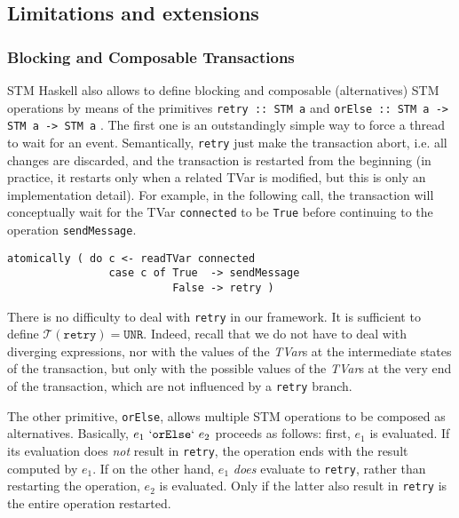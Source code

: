 \documentclass[submission,copyright,creativecommons]{eptcs}
\newcommand{\pt}{\ensuremath{\mathcal{T}}}
\begin{document}
\subsection{Limitations and extensions}
\label{discussion}

\subsubsection*{Blocking and Composable Transactions} 
STM Haskell also allows to define blocking and composable (alternatives) STM operations by means of the primitives \texttt{retry :: STM a} and \texttt{orElse :: STM a -> STM a -> STM a} \cite{composable-memory-transactions}.
The first one is an outstandingly simple way to force a thread to wait for an event. Semantically, \texttt{retry} just make the transaction abort, i.e. all changes are discarded, and the transaction is restarted from the beginning (in practice, it restarts only when a related TVar is modified, but this is only an implementation detail). For example, in the following call, the transaction will conceptually wait for the TVar \texttt{connected} to be \texttt{True} before continuing to the operation \texttt{sendMessage}.

\begin{footnotesize}
\begin{verbatim}
atomically ( do c <- readTVar connected
                case c of True  -> sendMessage
                          False -> retry )
\end{verbatim}  
\end{footnotesize}
There is no difficulty to deal with \texttt{retry} in our framework. It is sufficient to define $\pt(\mathtt{retry}) = \mathtt{UNR}$. 
Indeed, recall that we do not have to deal with diverging expressions, nor with the values of the \emph{TVar}s at the intermediate states of the transaction, but only with the possible values of the \emph{TVar}s at the very end of the transaction, which are not influenced by a \texttt{retry} branch.


The other primitive, \texttt{orElse}, allows multiple STM operations to be composed as alternatives. Basically, $e_1 \ \mathtt{`orElse`} \ e_2$ proceeds as follows: first, $e_1$ is evaluated. If its evaluation does \emph{not} result in \texttt{retry}, the operation ends with the result computed by $e_1$. If on the other hand, $e_1$ \emph{does} evaluate to \texttt{retry}, rather than restarting the operation, $e_2$ is evaluated. Only if the latter also result in \texttt{retry} is the entire operation restarted.
\end{document}

